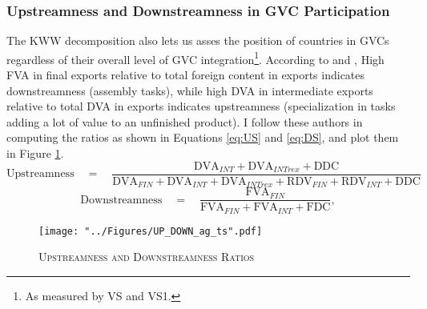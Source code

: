 \documentclass[a4paper]{article}
\begin{document}
\subsubsection{Upstreamness and Downstreamness in GVC Participation}


The KWW decomposition also lets us asses the position of countries in GVCs regardless of their overall level of GVC integration\footnote{As measured by VS and VS1.}. According to \citet{Kummritz20162} and \citet{wang2013quantifying}, High FVA in final exports relative to total foreign content in exports indicates downstreamness (assembly tasks), while high DVA in intermediate exports relative to total DVA in exports indicates upstreamness (specialization in tasks adding a lot of value to an unfinished product). I follow these authors in computing the ratios as shown in Equations \ref{eq:US} and \ref{eq:DS}, and plot them in Figure \ref{fig:UP_DOWN_ag_ts}.  
\begin{equation} \label{eq:US}
\text{Upstreamness}\quad =\quad \frac{\text{DVA}_{INT} + \text{DVA}_{INTrex} + \text{DDC}}{\text{DVA}_{FIN} + \text{DVA}_{INT} + \text{DVA}_{INTrex} + \text{RDV}_{FIN} + \text{RDV}_{INT} + \text{DDC}}
\end{equation}
\begin{equation} \label{eq:DS}
\text{Downstreamness}\quad =\quad \frac{\text{FVA}_{FIN}}{\text{FVA}_{FIN} + \text{FVA}_{INT} + \text{FDC}},
\end{equation}
\begin{figure}[h!] \vspace{-0.3cm}
\centering
\caption{\label{fig:UP_DOWN_ag_ts}\textsc{Upstreamness and Downstreamness Ratios}}
\texttt{[image: "../Figures/UP\_DOWN\_ag\_ts".pdf]} %
\end{figure} 
\FloatBarrier 
\end{document}
